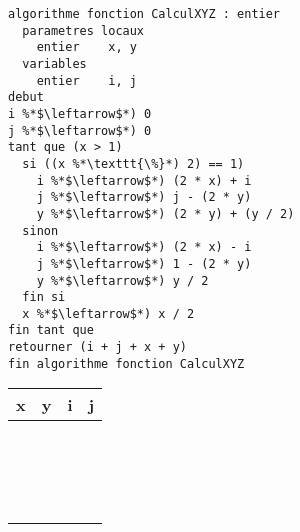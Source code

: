 \documentclass[11pt,a4paper]{article}
\begin{document}
\begin{table}[h!]
  \centering
  \begin{minipage}{0.59\textwidth}
    \centering
\begin{lstlisting}[style=algorithmique]
algorithme fonction CalculXYZ : entier
  parametres locaux
    entier    x, y
  variables
    entier    i, j
debut
i %*$\leftarrow$*) 0
j %*$\leftarrow$*) 0
tant que (x > 1)
  si ((x %*\texttt{\%}*) 2) == 1)
    i %*$\leftarrow$*) (2 * x) + i
    j %*$\leftarrow$*) j - (2 * y)
    y %*$\leftarrow$*) (2 * y) + (y / 2)
  sinon
    i %*$\leftarrow$*) (2 * x) - i
    j %*$\leftarrow$*) 1 - (2 * y)
    y %*$\leftarrow$*) y / 2
  fin si
  x %*$\leftarrow$*) x / 2
fin tant que
retourner (i + j + x + y)
fin algorithme fonction CalculXYZ \end{lstlisting}
  \end{minipage}
  \hfillx
  \begin{minipage}{0.4\textwidth}
    \centering
    \begin{tabular}{| C{1cm} | C{1cm} | C{1cm} | C{1cm} |}
        \hline
          x  &  y  &  i  &  j    \\
        \hline
             &     &     &       \\
             &     &     &       \\
             &     &     &       \\
        \hline
             &     &     &       \\
             &     &     &       \\
             &     &     &       \\
        \hline
             &     &     &       \\
             &     &     &       \\
             &     &     &       \\
        \hline
             &     &     &       \\
             &     &     &       \\
             &     &     &       \\
        \hline
             &     &     &       \\
             &     &     &       \\
             &     &     &       \\
        \hline
             &     &     &       \\
             &     &     &       \\

\end{tabular}
\end{minipage}
\end{table}
\end{document}

